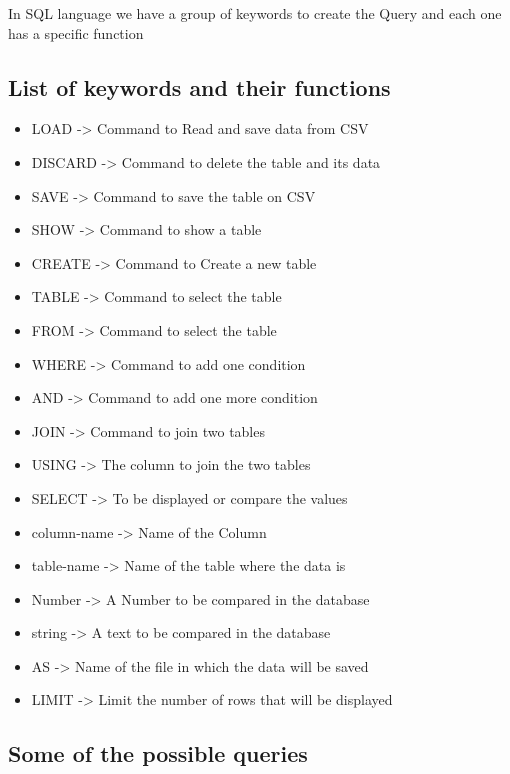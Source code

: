 \documentclass{article}
\begin{document}
\setlength{\parindent}{10ex} 
In SQL language we have a group of keywords to create the Query and each one has a specific function \par

\subsection{List of keywords and their functions }
\begin{itemize}
\item LOAD               ->  Command to Read and save data from CSV
\item DISCARD         ->  Command to delete the table and its data 
\item SAVE                 ->   Command to save the table on CSV
\item SHOW               ->  Command to show a table
\item CREATE            ->  Command to Create a new table
\item TABLE               ->  Command to select the table
\item FROM                ->  Command to select the table
\item WHERE             ->  Command to add one condition
\item AND                  ->   Command to add one more condition
\item JOIN                   ->  Command to join two tables
\item USING               ->  The column to join the two tables
\item SELECT             ->  To be displayed or compare the values
\item column-name  ->  Name of the Column 
\item table-name       ->  Name of the table where the data is
\item Number             ->  A Number to be compared in the database
\item string                  ->  A text to be compared in the database
\item AS                       ->  Name of the file in which the data will be saved
\item LIMIT                 ->  Limit the number of rows that will be displayed
\end{itemize}

\vspace{1.5cm}

\subsection{Some of the possible queries}
\end{document}
